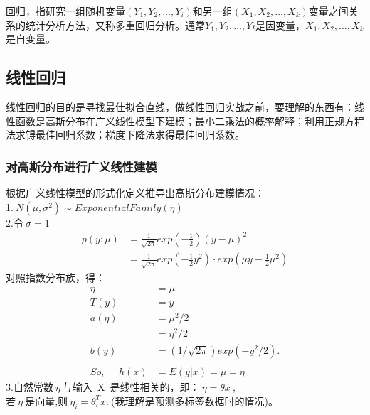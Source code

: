 回归，指研究一组随机变量$(Y_1,Y_2,\ldots,Y_i)$和另一组$(X_1,X_2,\ldots,X_k)$变量之间关系的统计分析方法，又称多重回归分析。通常$Y_1,Y_2,\ldots,Yi$是因变量，$X_1,X_2,\ldots,X_k$是自变量。

\subsection{线性回归}
线性回归的目的是寻找最佳拟合直线，做线性回归实战之前，要理解的东西有：线性函数是高斯分布在广义线性模型下建模；最小二乘法的概率解释；利用正规方程法求锝最佳回归系数；梯度下降法求得最佳回归系数。


\subsubsection{对高斯分布进行广义线性建模}
根据广义线性模型的形式化定义推导出高斯分布建模情况：\\
1.$~N(\mu,\sigma^2)\sim ExponentialFamily(\eta)$\\
2.令$~\sigma=1~$
\begin{equation}\nonumber
\begin{split}
  p(y;\mu)&=\frac{1}{\sqrt{2\pi}}exp(-\frac{1}{2})(y-\mu)^2\\
          &=\frac{1}{\sqrt{2\pi}}exp(-\frac{1}{2}y^2)\cdot exp(\mu y-\frac{1}{2} \mu ^2)
\end{split}
\end{equation}
对照指数分布族，得：
\begin{equation}\nonumber
\begin{split}
  \eta &= \mu\\
  T(y) &= y\\
  a(\eta)&=\mu^2/2\\
         &=\eta^2/2\\
  b(y)   &=(1/\sqrt{2\pi})exp(-y^2/2).\\
  ~\\
 So,~~~~~~ h(x) &=E(y|x)=\mu=\eta
\end{split}
\end{equation}
3.自然常数$~\eta~$与输入~X~是线性相关的，即：$~\eta = \theta x~$,\\
若$~\eta~$是向量,则$~\eta_i = \theta_i^T x.~$(我理解是预测多标签数据时的情况)。

